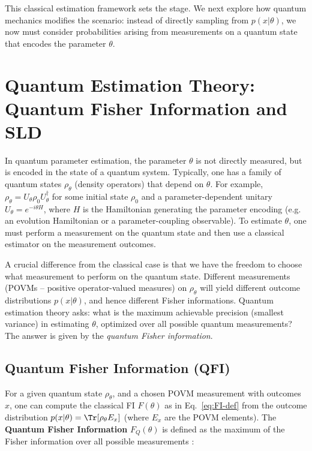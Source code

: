 This classical estimation framework sets the stage. We next explore
how quantum mechanics modifies the scenario: instead of directly
sampling from $p(x|\theta)$, we now must consider probabilities
arising from measurements on a quantum state that encodes the
parameter $\theta$.



\section{Quantum Estimation Theory: Quantum Fisher Information and SLD}

\label{sec:quantum-estimation}



In quantum parameter estimation, the parameter $\theta$ is not
directly measured, but is encoded in the state of a quantum
system. Typically, one has a family of quantum states $\rho_\theta$
(density operators) that depend on $\theta$. For example, $\rho_\theta
= U_\theta \rho_0 U_\theta^\dagger$ for some initial state $\rho_0$
and a parameter-dependent unitary $U_\theta = e^{-i\theta H}$, where
$H$ is the Hamiltonian generating the parameter encoding (e.g. an
evolution Hamiltonian or a parameter-coupling observable). To estimate
$\theta$, one must perform a measurement on the quantum state and then
use a classical estimator on the measurement outcomes.



A crucial difference from the classical case is that we have the
freedom to choose what measurement to perform on the quantum
state. Different measurements (POVMs – positive operator-valued
measures) on $\rho_\theta$ will yield different outcome distributions
$p(x|\theta)$, and hence different Fisher informations. Quantum
estimation theory asks: what is the maximum achievable precision
(smallest variance) in estimating $\theta$, optimized over all
possible quantum measurements? The answer is given by the
\textit{quantum Fisher information}.



\subsection{Quantum Fisher Information (QFI)}



For a given quantum state $\rho_\theta$, and a chosen POVM measurement
with outcomes $x$, one can compute the classical FI $F(\theta)$ as in
Eq.~\eqref{eq:FI-def} from the outcome distribution $p(x|\theta) =
\Tr[\rho_\theta E_x]$ (where ${E_x}$ are the POVM elements). The
\textbf{Quantum Fisher Information} $F_Q(\theta)$ is defined as the
maximum of the Fisher information over all possible measurements
\cite{BraunsteinCaves1994}:

